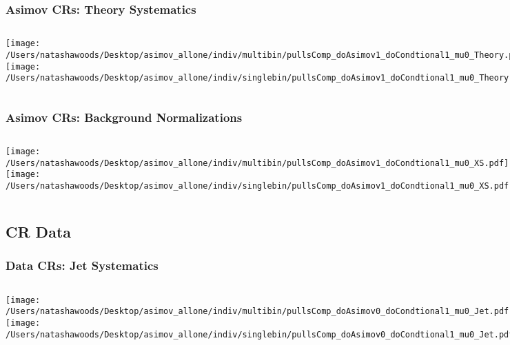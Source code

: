 \documentclass{beamer}
\begin{document}
\begin{frame}
\frametitle{Asimov CRs: Theory Systematics}
    \begin{columns}[t]
       \texttt{[image: /Users/natashawoods/Desktop/asimov\_allone/indiv/multibin/pullsComp\_doAsimov1\_doCondtional1\_mu0\_Theory.pdf]}
              \texttt{[image: /Users/natashawoods/Desktop/asimov\_allone/indiv/singlebin/pullsComp\_doAsimov1\_doCondtional1\_mu0\_Theory.pdf]}
       \end{columns}
\end{frame}

\begin{frame}
\frametitle{Asimov CRs: Background Normalizations}
    \begin{columns}[t]
       \texttt{[image: /Users/natashawoods/Desktop/asimov\_allone/indiv/multibin/pullsComp\_doAsimov1\_doCondtional1\_mu0\_XS.pdf]}
              \texttt{[image: /Users/natashawoods/Desktop/asimov\_allone/indiv/singlebin/pullsComp\_doAsimov1\_doCondtional1\_mu0\_XS.pdf]}
       \end{columns}
\end{frame}


\subsection{CR Data}
\begin{frame}
\frametitle{Data CRs: Jet Systematics}
    \begin{columns}[t]
       \texttt{[image: /Users/natashawoods/Desktop/asimov\_allone/indiv/multibin/pullsComp\_doAsimov0\_doCondtional1\_mu0\_Jet.pdf]}
              \texttt{[image: /Users/natashawoods/Desktop/asimov\_allone/indiv/singlebin/pullsComp\_doAsimov0\_doCondtional1\_mu0\_Jet.pdf]}
       \end{columns}
\end{frame}
\end{document}

